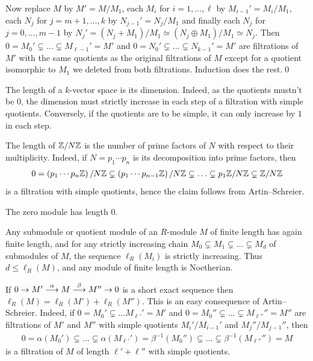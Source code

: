 \documentclass[a4paper,parskip=half,numbers=enddot, DIV=12]{scrreprt}
\begin{document}
\begin{rem}
\begin{alphanumerate}
        Now replace $M$ by $M'=M/M_1$, each $M_i$ for $i=1,\ldots,\ell$ by $M_{i-1}'=M_i/M_1$, each $N_j$ for $j= m+1,\ldots,k$ by $N_{j-1}'=N_j/M_1$ and finally each $N_j$ for $j=0,\ldots, m-1$ by $N_j'=(N_j+M_1)/M_1\simeq (N_j\oplus M_1)/M_1\simeq N_j$. Then $0=M_0'\subsetneq\ldots \subsetneq M_{\ell-1}'=M'$ and $0=N_0'\subsetneq \ldots\subsetneq N_{k-1}'=M'$ are filtrations of $M'$ with the same quotients as the original filtrations of $M$ except for a quotient isomorphic to $M_1$ we deleted from both filtrations. Induction does the rest.\qed
    \item 
        The length of a $k$-vector space is its dimension. Indeed, as the quotients mustn't be $0$, the dimension must strictly increase in each step of a filtration with simple quotients. Conversely, if the quotients are to be simple, it can only increase by $1$ in each step.
    \item
        The length of $\mathbb{Z}/N\mathbb{Z}$ is the number of prime factors of $N$ with respect to their multiplicity. Indeed, if $N=p_1\cdots p_n$ is its decomposition into prime factors, then
        \begin{align*}
        	0= \left(p_1\cdots p_n\mathbb{Z}\right)/N\mathbb{Z}\subsetneq \left(p_1\cdots p_{n-1}\mathbb{Z}\right)/N\mathbb{Z}\subsetneq\ldots\subsetneq p_1\mathbb{Z}/N\mathbb{Z}\subsetneq\mathbb{Z}/N\mathbb{Z}
        \end{align*}
        is a filtration with simple quotients, hence the claim follows from Artin--Schreier.
    \item 
        The zero module has length 0.
    \item 
        Any submodule or quotient module of an $R$-module $M$ of finite length has again finite length, and for any strictly increasing chain $M_0\subsetneq M_1\subsetneq\ldots\subsetneq M_d$ of submodules of $M$, the sequence $\ell_R(M_i)$ is strictly increasing. Thus $d\leq \ell_R(M)$, and any module of finite length is Noetherian.
    \item 
        If $0\morphism M' \morphism[\alpha] M\morphism[\beta] M'' \morphism 0$ is a short exact sequence then $\ell_R(M) = \ell_R(M') +\ell_R(M'')$. This is an easy consequence of Artin--Schreier. Indeed, if $0=M_0'\subsetneq\ldots M_{\ell'}'=M'$ and $0=M_0''\subsetneq\ldots\subsetneq M_{\ell''}''=M''$ are filtrations of $M'$ and $M''$ with simple quotients $M_i'/M_{i-1}'$ and $M_j''/M_{j-1}''$, then 
        \begin{align*}
        	0=\alpha(M_0')\subsetneq\ldots\subsetneq \alpha(M_{\ell'}')=\beta^{-1}(M_0'')\subsetneq\ldots\subsetneq \beta^{-1}(M_{\ell''}'')=M
        \end{align*}
        is a filtration of $M$ of length $\ell'+\ell''$ with simple quotients.
        

\end{alphanumerate}
\end{rem}
\end{document}
